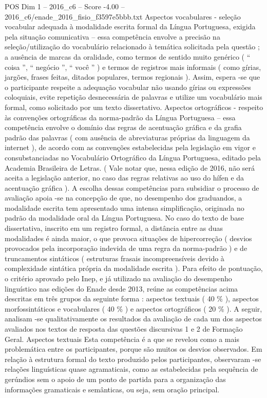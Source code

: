 \begin{textsample}{POS Dim 1 – 2016\_c6 – Score -4.00 – 2016\_c6/enade\_2016\_fisio\_f3597e5bbb.txt}
Aspectos vocabulares - seleção vocabular adequada à modalidade escrita formal da Língua Portuguesa, exigida pela situação comunicativa – essa competência envolve a precisão na seleção/utilização do vocabulário relacionado à temática solicitada pela questão ; a ausência de marcas da oralidade, como termos de sentido muito genérico ( “ coisa ”, “ negócio ”, “ você ” ) e termos de registros mais informais ( como gírias, jargões, frases feitas, ditados populares, termos regionais ).
Assim, espera -se que o participante respeite a adequação vocabular não usando gírias ou expressões coloquiais, evite repetição desnecessária de palavras e utilize um vocabulário mais formal, como solicitado por um texto dissertativo.
Aspectos ortográficos - respeito às convenções ortográficas da norma-padrão da Língua Portuguesa – essa competência envolve o domínio das regras de acentuação gráfica e da grafia padrão das palavras ( com ausência de abreviaturas próprias da linguagem da internet ), de acordo com as convenções estabelecidas pela legislação em vigor e consubstanciadas no Vocabulário Ortográfico da Língua Portuguesa, editado pela Academia Brasileira de Letras. ( Vale notar que, nessa edição de 2016, não será aceita a legislação anterior, no caso das regras relativas ao uso do hífen e da acentuação gráfica ).
A escolha dessas competências para subsidiar o processo de avaliação apoia -se na concepção de que, no desempenho dos graduandos, a modalidade escrita tem apresentado uma intensa simplificação, originada no padrão da modalidade oral da Língua Portuguesa.
No caso do texto de base dissertativa, inscrito em um registro formal, a distância entre as duas modalidades é ainda maior, o que provoca situações de hipercorreção ( desvios provocados pela incorporação indevida de uma regra da norma-padrão ) e de truncamentos sintáticos ( estruturas frasais incompreensíveis devido à complexidade sintática própria da modalidade escrita ).
Para efeito de pontuação, o critério aprovado pelo Inep, e já utilizado na avaliação do desempenho linguístico nas edições do Enade desde 2013, reúne as competências acima descritas em três grupos da seguinte forma : aspectos textuais ( 40 \% ), aspectos morfossintáticos e vocabulares ( 40 \% ) e aspectos ortográficos ( 20 \% ).
A seguir, analisam -se qualitativamente os resultados da avaliação de cada um dos aspectos avaliados nos textos de resposta das questões discursivas 1 e 2 de Formação Geral.
Aspectos textuais Esta competência é a que se revelou como a mais problemática entre os participantes, porque são muitos os desvios observados.
Em relação à estrutura formal do texto produzido pelos participantes, observaram -se relações linguísticas quase agramaticais, como as estabelecidas pela sequência de gerúndios sem o apoio de um ponto de partida para a organização das informações gramaticais e semânticas, ou seja, sem oração principal.

\end{textsample}
